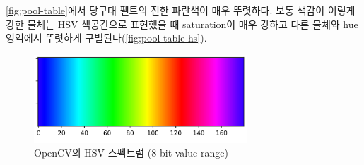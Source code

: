 \documentclass[11pt]{oblivoir}
\begin{document}

    \cref{fig;pool-table}에서 당구대 펠트의 진한 파란색이 매우 뚜렷하다. 보통 색감이 이렇게 강한 물체는 HSV 색공간으로 표현했을 때 saturation이 매우 강하고 다른 물체와 hue 영역에서 뚜렷하게 구별된다(\cref{fig;pool-table-hs}).

    \begin{figure}[ht]
        \centering
        \includegraphics[width=8cm]{img/hsv-spectrum.png}
        \caption{OpenCV의 HSV 스펙트럼 (8-bit value range)}
        \label{fig;hsv-spectrum}
    \end{figure}
\end{document}
